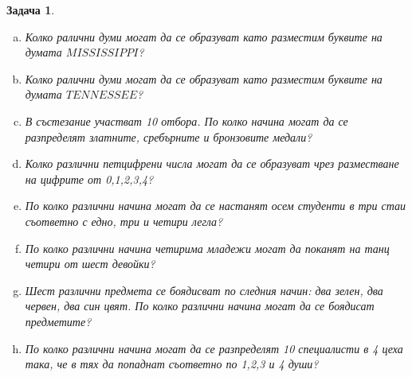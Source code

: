 \documentclass[a4paper]{article}
\newtheorem{problem}{Задача}
\begin{document}
\author{Stefan Vatev}


\begin{problem}
  \begin{enumerate}[a)]
  \item
    Колко ралични думи могат да се образуват като разместим буквите на думата $MISSISSIPPI$?
  \item
    Колко ралични думи могат да се образуват като разместим буквите на думата $TENNESSEE$?
  \item
    В състезание участват 10 отбора. 
    По колко начина могат да се разпределят златните, сребърните и бронзовите медали?
  \item
    Колко различни петцифрени числа могат да се образуват чрез разместване на цифрите от 0,1,2,3,4?
  \item
    По колко различни начина могат да се настанят осем студенти в три стаи съответно с едно, три и четири легла?
  \item
    По колко различни начина четирима младежи могат да поканят на танц четири от шест девойки?
  \item
    Шест различни предмета се боядисват по следния начин: два зелен, два червен, два син цвят.
    По колко различни начина могат да се боядисат предметите?  
  \item
    По колко различни начина могат да се разпределят 10 специалисти в 4 цеха така, че в тях да попаднат съответно по 1,2,3 и 4 души?
  \end{enumerate}
\end{problem}
\end{document}
